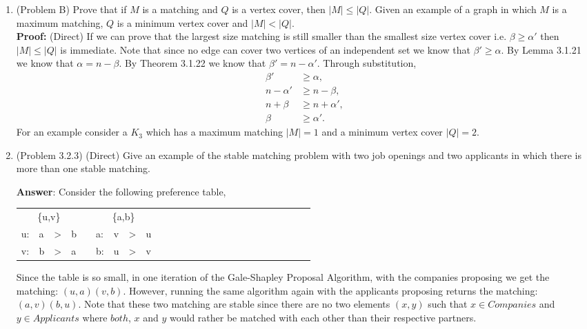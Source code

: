 \documentclass{amsart}
\begin{document}
\begin{enumerate}
\vspace{1.5in}

\item (Problem B) Prove that if $M$ is a matching and $Q$ is a vertex cover, then $|M| \leq |Q|.$ Given an example of a graph in which $M$ is a maximum matching, $Q$ is a minimum vertex cover and $|M| < |Q|.$\\

\textbf{Proof:} (Direct) If we can prove that the largest size matching is still smaller than the smallest size vertex cover i.e. $\beta \geq \alpha'$ then $|M| \leq |Q|$ is immediate. Note that since no edge can cover two vertices of an independent set we know that $\beta' \geq \alpha$. By Lemma 3.1.21 we know that $\alpha = n - \beta$. By Theorem 3.1.22 we know that $\beta' = n - \alpha'$. Through substitution,
\begin{align*}
\beta' &\geq \alpha,\\
 n - \alpha' &\geq n - \beta,\\
  n +  \beta &\geq n + \alpha',\\
  \beta &\geq \alpha'.
\end{align*}
For an example consider a $K_3$ which has a maximum matching $|M| = 1$ and a minimum vertex cover $|Q| = 2$.

\vspace{1.5in}

\item (Problem 3.2.3) (Direct) Give an example of the stable matching problem with two job openings and two applicants in which there is more than one stable matching.
 
\textbf{Answer}: Consider the following preference table,
\begin{center}
\begin{tabular}{LLLLLLLLLLLLL LLLLLLLLLLLL }
&& \\
u:&a&>&b& \quad \quad \quad &a:&v&>&u&\\
v:&b&>&a& \quad \quad \quad  &b:&u&>&v&\\
\end{tabular}
\end{center}
Since the table is so small, in one iteration of the Gale-Shapley Proposal Algorithm, with the companies proposing we get the matching: $(u,a)(v,b)$. However, running the same algorithm again with the applicants proposing returns the matching: $(a,v)(b,u)$. Note that these two matching are stable since there are no two elements $(x,y)$ such that $x \in Companies$ and $y \in Applicants$ where $both$, $x$ and $y$ would rather be matched with each other than their respective partners. 
\vspace{.5in}


\end{enumerate}
\end{document}

